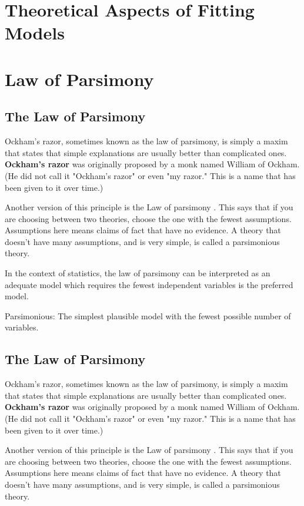 \documentclass[a4paper,12pt]{article}
\begin{document}
\tableofcontents
\newpage

\section{Theoretical Aspects of Fitting Models}

\section{Law of Parsimony}
\subsection{The Law of Parsimony}
Ockham's razor, sometimes known as the law of parsimony, is simply a maxim that states that simple explanations are usually better than complicated ones. \textbf{Ockham's razor} was originally proposed by a monk named William of Ockham. (He did not call it "Ockham's razor" or even "my razor." This is a name that has been given to it over time.)

Another version of this principle is the Law of parsimony . This says that if you are choosing between two theories, choose the one with the fewest assumptions. Assumptions here means claims of fact that have no evidence.
A theory that doesn't have many assumptions, and is very simple, is called a parsimonious theory.

In the context of statistics, the law of parsimony can be interpreted as an adequate model which requires the fewest independent variables is the preferred model.
\begin{framed}
	Parsimonious: The simplest plausible model with the fewest possible number of variables.
\end{framed}



\subsection{The Law of Parsimony}
Ockham's razor, sometimes known as the law of parsimony, is simply a maxim that states that simple explanations are usually better than complicated ones. \textbf{Ockham's razor} was originally proposed by a monk named William of Ockham. (He did not call it "Ockham's razor" or even "my razor." This is a name that has been given to it over time.)

Another version of this principle is the Law of parsimony . This says that if you are choosing between two theories, choose the one with the fewest assumptions. Assumptions here means claims of fact that have no evidence.
A theory that doesn't have many assumptions, and is very simple, is called a parsimonious theory.
\end{document}
